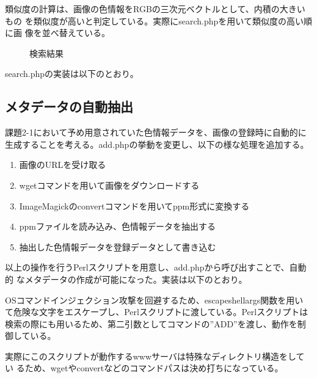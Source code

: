\documentclass[a4paper,9pt]{jsarticle}
\begin{document}


類似度の計算は、画像の色情報をRGBの三次元ベクトルとして、内積の大きいもの
を類似度が高いと判定している。実際にsearch.phpを用いて類似度の高い順に画
像を並べ替えている。
\begin{figure}[H]
 \caption{検索結果}
 \begin{center}
 \end{center}
\end{figure}

search.phpの実装は以下のとおり。


\subsection{メタデータの自動抽出}
課題2-1において予め用意されていた色情報データを、画像の登録時に自動的に
生成することを考える。add.phpの挙動を変更し、以下の様な処理を追加する。

\begin{enumerate}
 \item 画像のURLを受け取る
 \item wgetコマンドを用いて画像をダウンロードする
 \item ImageMagickのconvertコマンドを用いてppm形式に変換する
 \item ppmファイルを読み込み、色情報データを抽出する
 \item 抽出した色情報データを登録データとして書き込む
\end{enumerate}
以上の操作を行うPerlスクリプトを用意し、add.phpから呼び出すことで、自動的
なメタデータの作成が可能になった。実装は以下のとおり。


OSコマンドインジェクション攻撃を回避するため、escapeshellargs関数を用い
て危険な文字をエスケープし、Perlスクリプトに渡している。Perlスクリプトは
検索の際にも用いるため、第二引数としてコマンドの''ADD''を渡し、動作を制
御している。

実際にこのスクリプトが動作するwwwサーバは特殊なディレクトリ構造をしてい
るため、wgetやconvertなどのコマンドパスは決め打ちになっている。
\end{document}
